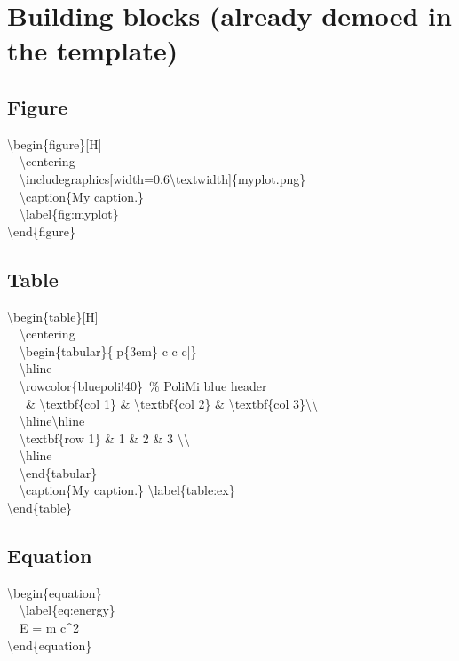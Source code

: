 \documentclass[11pt]{article}
\begin{document}
\section{Building blocks (already demoed in the template)}

\subsection{Figure}
\begin{cmd}
\textbackslash begin\{figure\}[H]\\
\ \ \textbackslash centering\\
\ \ \textbackslash includegraphics[width=0.6\textbackslash textwidth]\{myplot.png\}\\
\ \ \textbackslash caption\{My caption.\}\\
\ \ \textbackslash label\{fig:myplot\}\\
\textbackslash end\{figure\}
\end{cmd}

\subsection{Table}
\begin{cmd}
\textbackslash begin\{table\}[H]\\
\ \ \textbackslash centering\\
\ \ \textbackslash begin\{tabular\}\{|p\{3em\} c c c|\}\\
\ \ \textbackslash hline\\
\ \ \textbackslash rowcolor\{bluepoli!40\}\ \% PoliMi blue header\\
\ \ \ \& \textbackslash textbf\{col 1\} \& \textbackslash textbf\{col 2\} \& \textbackslash textbf\{col 3\}\textbackslash\textbackslash\\
\ \ \textbackslash hline\textbackslash hline\\
\ \ \textbackslash textbf\{row 1\} \& 1 \& 2 \& 3 \textbackslash\textbackslash\\
\ \ \textbackslash hline\\
\ \ \textbackslash end\{tabular\}\\
\ \ \textbackslash caption\{My caption.\} \textbackslash label\{table:ex\}\\
\textbackslash end\{table\}
\end{cmd}

\subsection{Equation}
\begin{cmd}
\textbackslash begin\{equation\}\\
\ \ \textbackslash label\{eq:energy\}\\
\ \ E = m c\textasciicircum 2\\
\textbackslash end\{equation\}
\end{cmd}
\end{document}
